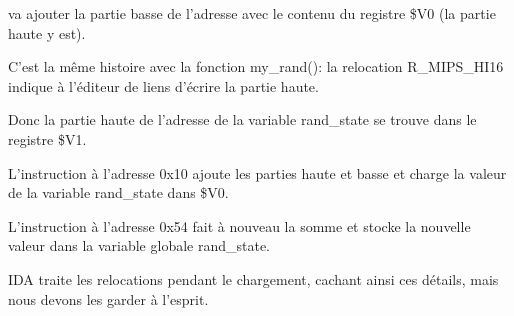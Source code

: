 \SW va ajouter la partie basse de l'adresse avec le contenu du registre \$V0 (la
partie haute y est).

C'est la même histoire avec la fonction my\_rand(): la relocation R\_MIPS\_HI16 indique
à l'éditeur de liens d'écrire la partie haute.

Donc la partie haute de l'adresse de la variable rand\_state se trouve dans le registre
\$V1.

L'instruction \LW à l'adresse 0x10 ajoute les parties haute et basse et charge la
valeur de la variable rand\_state dans \$V0.

L'instruction \SW à l'adresse 0x54 fait à nouveau la somme et stocke la nouvelle
valeur dans la variable globale rand\_state.

IDA traite les relocations pendant le chargement, cachant ainsi ces détails, mais
nous devons les garder à l'esprit.

